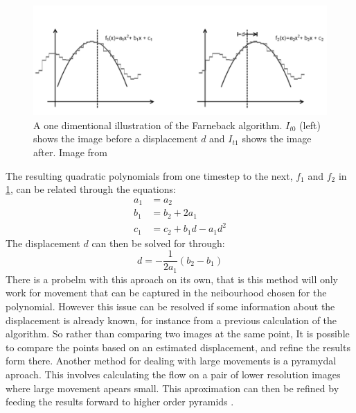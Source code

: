 \documentclass{UoNMCHA}
\numberwithin{equation}{section}
\begin{document}
\begin{figure}[ht]\label{fig:farnebackAlgorithm}
    \begin{center}
        \includegraphics[width=1\linewidth]{Figures/farnebackAccuracy}
        \caption{A one dimentional illustration of the Farneback algorithm. $I_{t0}$ (left) shows the image before a displacement $d$ and $I_{t1}$ shows the image after. Image from \citep{learningOpenCV}}
    \end{center}
\end{figure}
The resulting quadratic polynomials from one timestep to the next, $f_{1}$ and $f_{2}$ in \cref{fig:farnebackAlgorithm}, can be related through the equations:
\begin{equation}
	\begin{split}
		a_{1} &= a_{2}\\
		b_{1} &= b_{2} + 2a_{1}\\
		c_{1} &= c_{2} + b_{1}d-a_{1}d^{2}
	\end{split}
\end{equation}
The displacement $d$ can then be solved for through:
\begin{equation}
	d = -\frac{1}{2a_{1}}(b_{2}-b_{1})
\end{equation}
There is a probelm with this aproach on its own, that is this method will only work for movement that can be captured in the neibourhood chosen for the polynomial. However this issue can be resolved if some information about the displacement is already known, for instance from a previous calculation of the algorithm. So rather than comparing two images at the same point, It is possible to compare the points based on an estimated displacement, and refine the results form there. Another method for dealing with large movements is a pyramydal aproach. This involves calculating the flow on a pair of lower resolution images where large movement apears small. This aproximation can then be refined by feeding the results forward to higher order pyramids \citep{learningOpenCV}.
\end{document}
